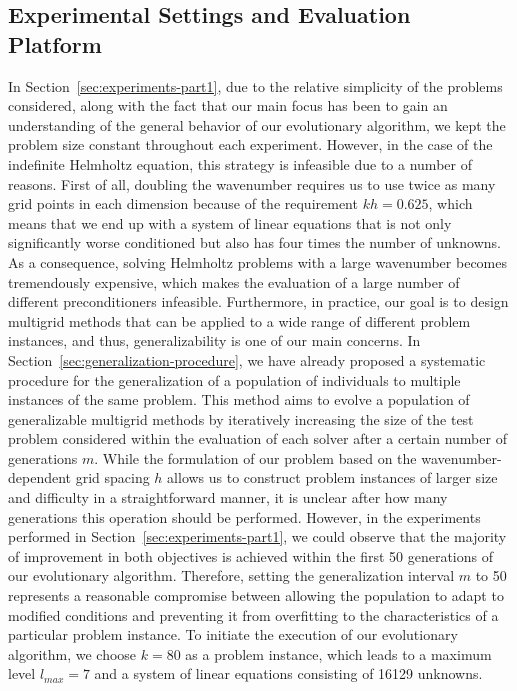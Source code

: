\subsection{Experimental Settings and Evaluation Platform}
In Section~\ref{sec:experiments-part1}, due to the relative simplicity of the problems considered, along with the fact that our main focus has been to gain an understanding of the general behavior of our evolutionary algorithm, we kept the problem size constant throughout each experiment.
However, in the case of the indefinite Helmholtz equation, this strategy is infeasible due to a number of reasons.
First of all, doubling the wavenumber requires us to use twice as many grid points in each dimension because of the requirement $kh = 0.625$, which means that we end up with a system of linear equations that is not only significantly worse conditioned but also has four times the number of unknowns.
As a consequence, solving Helmholtz problems with a large wavenumber becomes tremendously expensive, which makes the evaluation of a large number of different preconditioners infeasible.
Furthermore, in practice, our goal is to design multigrid methods that can be applied to a wide range of different problem instances, and thus, generalizability is one of our main concerns.
In Section~\ref{sec:generalization-procedure}, we have already proposed a systematic procedure for the generalization of a population of individuals to multiple instances of the same problem.
This method aims to evolve a population of generalizable multigrid methods by iteratively increasing the size of the test problem considered within the evaluation of each solver after a certain number of generations $m$.
While the formulation of our problem based on the wavenumber-dependent grid spacing $h$ allows us to construct problem instances of larger size and difficulty in a straightforward manner, it is unclear after how many generations this operation should be performed.
However, in the experiments performed in Section~\ref{sec:experiments-part1}, we could observe that the majority of improvement in both objectives is achieved within the first 50 generations of our evolutionary algorithm.
Therefore, setting the generalization interval $m$ to 50 represents a reasonable compromise between allowing the population to adapt to modified conditions and preventing it from overfitting to the characteristics of a particular problem instance.
To initiate the execution of our evolutionary algorithm, we choose $k = 80$ as a problem instance, which leads to a maximum level $l_{max} = 7$ and a system of linear equations consisting of 16129 unknowns. 
